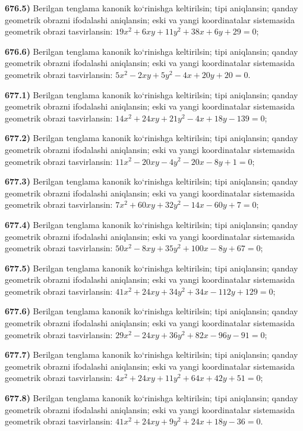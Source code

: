 \textbf{676.5)} Berilgan tenglama kanonik ko‘rinishga keltirilsin; tipi aniqlansin; qanday geometrik obrazni ifodalashi aniqlansin; eski va yangi koordinatalar sistemasida geometrik obrazi tasvirlansin: $19 x^2+6 x y+11 y^2+38 x+6 y+29=0$;

\textbf{676.6)} Berilgan tenglama kanonik ko‘rinishga keltirilsin; tipi aniqlansin; qanday geometrik obrazni ifodalashi aniqlansin; eski va yangi koordinatalar sistemasida geometrik obrazi tasvirlansin: $5 x^2-2 x y+5 y^2-4 x+20 y+20=0$.

\textbf{677.1)} Berilgan tenglama kanonik ko‘rinishga keltirilsin; tipi aniqlansin; qanday geometrik obrazni ifodalashi aniqlansin; eski va yangi koordinatalar sistemasida geometrik obrazi tasvirlansin: $14 x^2+24 x y+21 y^2-4 x+18 y-139=0$;

\textbf{677.2)} Berilgan tenglama kanonik ko‘rinishga keltirilsin; tipi aniqlansin; qanday geometrik obrazni ifodalashi aniqlansin; eski va yangi koordinatalar sistemasida geometrik obrazi tasvirlansin: $11 x^2-20 x y-4 y^2-20 x-8 y+1=0$;

\textbf{677.3)} Berilgan tenglama kanonik ko‘rinishga keltirilsin; tipi aniqlansin; qanday geometrik obrazni ifodalashi aniqlansin; eski va yangi koordinatalar sistemasida geometrik obrazi tasvirlansin: $7 x^2+60 x y+32 y^2-14 x-60 y+7=0$;

\textbf{677.4)} Berilgan tenglama kanonik ko‘rinishga keltirilsin; tipi aniqlansin; qanday geometrik obrazni ifodalashi aniqlansin; eski va yangi koordinatalar sistemasida geometrik obrazi tasvirlansin: $50 x^2-8 x y+35 y^2+100 x-8 y+67=0$;

\textbf{677.5)} Berilgan tenglama kanonik ko‘rinishga keltirilsin; tipi aniqlansin; qanday geometrik obrazni ifodalashi aniqlansin; eski va yangi koordinatalar sistemasida geometrik obrazi tasvirlansin: $41 x^2+24 x y+34 y^2+34 x-112 y+129=0$;

\textbf{677.6)} Berilgan tenglama kanonik ko‘rinishga keltirilsin; tipi aniqlansin; qanday geometrik obrazni ifodalashi aniqlansin; eski va yangi koordinatalar sistemasida geometrik obrazi tasvirlansin: $29 x^2-24 x y+36 y^2+82 x-96 y-91=0$;

\textbf{677.7)} Berilgan tenglama kanonik ko‘rinishga keltirilsin; tipi aniqlansin; qanday geometrik obrazni ifodalashi aniqlansin; eski va yangi koordinatalar sistemasida geometrik obrazi tasvirlansin: $4 x^2+24 x y+11 y^2+64 x+42 y+51=0$;

\textbf{677.8)} Berilgan tenglama kanonik ko‘rinishga keltirilsin; tipi aniqlansin; qanday geometrik obrazni ifodalashi aniqlansin; eski va yangi koordinatalar sistemasida geometrik obrazi tasvirlansin: $41 x^2+24 x y+9 y^2+24 x+18 y-36=0$.

